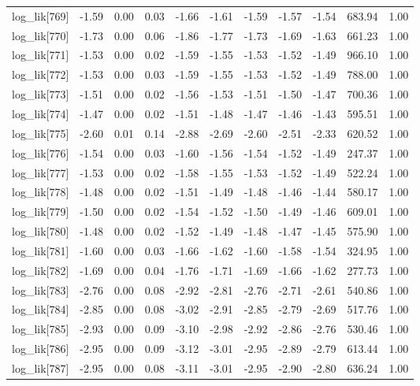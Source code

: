 \begin{table}[ht]
\begin{tabular}{rrrrrrrrrrr}
  log\_lik[769] & -1.59 & 0.00 & 0.03 & -1.66 & -1.61 & -1.59 & -1.57 & -1.54 & 683.94 & 1.00 \\ 
  log\_lik[770] & -1.73 & 0.00 & 0.06 & -1.86 & -1.77 & -1.73 & -1.69 & -1.63 & 661.23 & 1.00 \\ 
  log\_lik[771] & -1.53 & 0.00 & 0.02 & -1.59 & -1.55 & -1.53 & -1.52 & -1.49 & 966.10 & 1.00 \\ 
  log\_lik[772] & -1.53 & 0.00 & 0.03 & -1.59 & -1.55 & -1.53 & -1.52 & -1.49 & 788.00 & 1.00 \\ 
  log\_lik[773] & -1.51 & 0.00 & 0.02 & -1.56 & -1.53 & -1.51 & -1.50 & -1.47 & 700.36 & 1.00 \\ 
  log\_lik[774] & -1.47 & 0.00 & 0.02 & -1.51 & -1.48 & -1.47 & -1.46 & -1.43 & 595.51 & 1.00 \\ 
  log\_lik[775] & -2.60 & 0.01 & 0.14 & -2.88 & -2.69 & -2.60 & -2.51 & -2.33 & 620.52 & 1.00 \\ 
  log\_lik[776] & -1.54 & 0.00 & 0.03 & -1.60 & -1.56 & -1.54 & -1.52 & -1.49 & 247.37 & 1.00 \\ 
  log\_lik[777] & -1.53 & 0.00 & 0.02 & -1.58 & -1.55 & -1.53 & -1.52 & -1.49 & 522.24 & 1.00 \\ 
  log\_lik[778] & -1.48 & 0.00 & 0.02 & -1.51 & -1.49 & -1.48 & -1.46 & -1.44 & 580.17 & 1.00 \\ 
  log\_lik[779] & -1.50 & 0.00 & 0.02 & -1.54 & -1.52 & -1.50 & -1.49 & -1.46 & 609.01 & 1.00 \\ 
  log\_lik[780] & -1.48 & 0.00 & 0.02 & -1.52 & -1.49 & -1.48 & -1.47 & -1.45 & 575.90 & 1.00 \\ 
  log\_lik[781] & -1.60 & 0.00 & 0.03 & -1.66 & -1.62 & -1.60 & -1.58 & -1.54 & 324.95 & 1.00 \\ 
  log\_lik[782] & -1.69 & 0.00 & 0.04 & -1.76 & -1.71 & -1.69 & -1.66 & -1.62 & 277.73 & 1.00 \\ 
  log\_lik[783] & -2.76 & 0.00 & 0.08 & -2.92 & -2.81 & -2.76 & -2.71 & -2.61 & 540.86 & 1.00 \\ 
  log\_lik[784] & -2.85 & 0.00 & 0.08 & -3.02 & -2.91 & -2.85 & -2.79 & -2.69 & 517.76 & 1.00 \\ 
  log\_lik[785] & -2.93 & 0.00 & 0.09 & -3.10 & -2.98 & -2.92 & -2.86 & -2.76 & 530.46 & 1.00 \\ 
  log\_lik[786] & -2.95 & 0.00 & 0.09 & -3.12 & -3.01 & -2.95 & -2.89 & -2.79 & 613.44 & 1.00 \\ 
  log\_lik[787] & -2.95 & 0.00 & 0.08 & -3.11 & -3.01 & -2.95 & -2.90 & -2.80 & 636.24 & 1.00 \\ 

\end{tabular}
\end{table}
